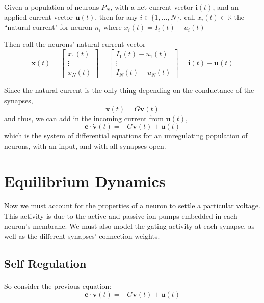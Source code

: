 \documentclass{article}
\begin{document}
\begin{definition}[$\mathbf{x}(t) =$ \textbf{natural current vector}]\label{x}
Given a population of neurons $P_{N}$, with a net current vector $\mathbf{i}(t)$, and an applied current vector $\mathbf{u}(t)$, then for any $i \in \{ 1, \dots, N \}$, call $x_{i}(t)\in\mathbb{R}$ the ``natural current" for neuron $n_{i}$ where $x_{i}(t) = I_{i}(t) - u_{i}(t)$

Then call the neurons' natural current vector
\[ \mathbf{x}(t) =
\begin{bmatrix}
x_{1}(t) \\
\vdots \\
x_{N}(t)
\end{bmatrix}
= 
\begin{bmatrix}
I_{1}(t) - u_{1}(t)\\
\vdots \\
I_{N}(t) - u_{N}(t)
\end{bmatrix}
= \mathbf{i}(t) - \mathbf{u}(t)\]
\end{definition}

Since the natural current is the only thing depending on the conductance of the synapses,
\[ \mathbf{x}(t) = G\mathbf{v}(t) \]
and thus, we can add in the incoming current from $\mathbf{u}(t)$,
\[ \boxed{ \mathbf{c}\cdot\dot{\mathbf{v}}(t) = -G\mathbf{v}(t) + \mathbf{u}(t) } \]
which is the system of differential equations for an unregulating population of neurons, with an input, and with all synapses open.

\section{Equilibrium Dynamics}

\paragraph{} 
Now we must account for the properties of a neuron to settle a particular voltage. This activity is due to the active and passive ion pumps embedded in each neuron's membrane. We must also model the gating activity at each synapse, as well as the different synapses' connection weights.

\subsection{Self Regulation}

\paragraph{}
So consider the previous equation:
\[ \mathbf{c}\cdot\dot{\mathbf{v}}(t) = -G\mathbf{v}(t) + \mathbf{u}(t)\]
\end{document}
